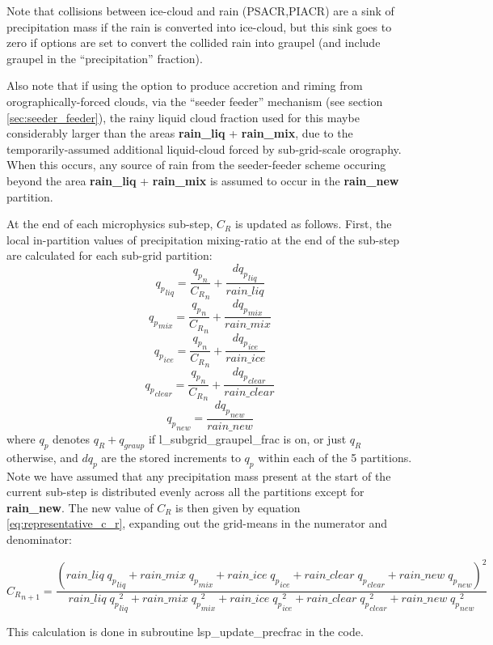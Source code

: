 \documentclass{UMDP_article}
\begin{document}
Note that collisions between ice-cloud and rain (PSACR,PIACR) are a
sink of precipitation mass if the rain is converted into ice-cloud,
but this sink goes to zero if options are set to convert the collided rain
into graupel (and include graupel in the ``precipitation'' fraction).

Also note that if using the option to produce accretion and riming from
orographically-forced clouds, via the ``seeder feeder'' mechanism
(see section \ref{sec:seeder_feeder}), the rainy liquid cloud fraction
used for this maybe considerably larger than the areas
{\bf rain\_liq} + {\bf rain\_mix},
due to the temporarily-assumed additional liquid-cloud forced by sub-grid-scale
orography.  When this occurs, any source of rain from the seeder-feeder scheme
occuring beyond the area {\bf rain\_liq} + {\bf rain\_mix}
is assumed to occur in the {\bf rain\_new} partition.

At the end of each microphysics sub-step, $C_R$ is updated as follows.
First, the local in-partition values of precipitation mixing-ratio at
the end of the sub-step are calculated for each sub-grid partition:
\[
{q_p}_{liq} = \frac{{q_p}_n}{{C_R}_n} + \frac{d{q_p}_{liq}}{rain\_liq}
\]
\[
{q_p}_{mix} = \frac{{q_p}_n}{{C_R}_n} + \frac{d{q_p}_{mix}}{rain\_mix}
\]
\[
{q_p}_{ice} = \frac{{q_p}_n}{{C_R}_n} + \frac{d{q_p}_{ice}}{rain\_ice}
\]
\[
{q_p}_{clear} = \frac{{q_p}_n}{{C_R}_n} + \frac{d{q_p}_{clear}}{rain\_clear}
\]
\[
{q_p}_{new} = \frac{d{q_p}_{new}}{rain\_new}
\]
where ${q_p}$ denotes $q_R + q_{graup}$ if l\_subgrid\_graupel\_frac is on,
or just $q_R$ otherwise, and $d{q_p}$ are the stored increments to ${q_p}$
within each of the 5 partitions.  Note we have assumed that any precipitation
mass present at the start of the current sub-step is distributed evenly
across all the partitions except for {\bf rain\_new}.  The new value
of $C_R$ is then given by equation \ref{eq:representative_c_r}, expanding
out the grid-means in the numerator and denominator:

\[
{C_R}_{n+1} = \frac{ \left( rain\_liq \; {q_p}_{liq} + rain\_mix \; {q_p}_{mix}
                         + rain\_ice \; {q_p}_{ice} + rain\_clear \; {q_p}_{clear}
                         + rain\_new \; {q_p}_{new} \right)^2 }
                 { rain\_liq \; {q_p}_{liq}^2 + rain\_mix \; {q_p}_{mix}^2
                 + rain\_ice \; {q_p}_{ice}^2 + rain\_clear \; {q_p}_{clear}^2
                 + rain\_new \; {q_p}_{new}^2 }
\]

This calculation is done in subroutine lsp\_update\_precfrac in the code.
\end{document}
